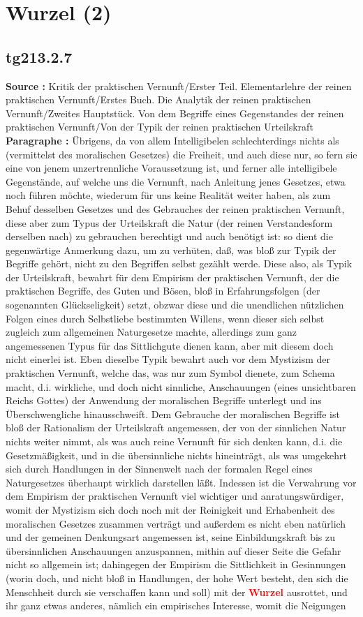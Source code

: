 \documentclass[a4paper,12pt,twoside]{book}
\newcommand{\match}[1]{\textcolor{red}{\textbf{#1}}}
\newcommand{\unnumberedsection}[1]{
	\section*{#1}
	\addcontentsline{toc}{section}{#1}
	\markright{#1}
}
\begin{document}
	\unnumberedsection{Wurzel (2)} 
	\subsection*{tg213.2.7} 
	\textbf{Source : }Kritik der praktischen Vernunft/Erster Teil. Elementarlehre der reinen praktischen Vernunft/Erstes Buch. Die Analytik der reinen praktischen Vernunft/Zweites Hauptstück. Von dem Begriffe eines Gegenstandes der reinen praktischen Vernunft/Von der Typik der reinen praktischen Urteilskraft\\  
	
	\textbf{Paragraphe : }Übrigens, da von allem Intelligibelen schlechterdings nichts als (vermittelst des moralischen Gesetzes) die Freiheit, und auch diese nur, so fern sie eine von jenem unzertrennliche Voraussetzung ist, und ferner alle intelligibele Gegenstände, auf welche uns die Vernunft, nach Anleitung  jenes Gesetzes, etwa noch führen möchte, wiederum für uns keine Realität weiter haben, als zum Behuf desselben Gesetzes und des Gebrauches der reinen praktischen Vernunft, diese aber zum Typus der Urteilskraft die Natur (der reinen Verstandesform derselben nach) zu gebrauchen berechtigt und auch benötigt ist: so dient die gegenwärtige Anmerkung dazu, um zu verhüten, daß, was bloß zur Typik der Begriffe gehört, nicht zu den Begriffen selbst gezählt werde. Diese also, als Typik der Urteilskraft, bewahrt für dem Empirism der praktischen Vernunft, der die praktischen Begriffe, des Guten und Bösen, bloß in Erfahrungsfolgen (der sogenannten Glückseligkeit) setzt, obzwar diese und die unendlichen nützlichen Folgen eines durch Selbstliebe bestimmten Willens, wenn dieser sich selbst zugleich zum allgemeinen Naturgesetze machte, allerdings zum ganz angemessenen Typus für das Sittlichgute dienen kann, aber mit diesem doch nicht einerlei ist. Eben dieselbe Typik bewahrt auch vor dem Mystizism der praktischen Vernunft, welche das, was nur zum Symbol dienete, zum Schema macht, d.i. wirkliche, und doch nicht sinnliche, Anschauungen (eines unsichtbaren Reichs Gottes) der Anwendung der moralischen Begriffe unterlegt und ins Überschwengliche hinausschweift. Dem Gebrauche der moralischen Begriffe ist bloß der Rationalism der Urteilskraft angemessen, der von der sinnlichen Natur nichts weiter nimmt, als was auch reine Vernunft für sich denken kann, d.i. die Gesetzmäßigkeit, und in die übersinnliche nichts hineinträgt, als was umgekehrt sich durch Handlungen in der Sinnenwelt nach der formalen Regel eines Naturgesetzes überhaupt wirklich darstellen läßt. Indessen ist die Verwahrung vor dem Empirism der praktischen Vernunft viel wichtiger und anratungswürdiger, womit der Mystizism sich doch noch mit der Reinigkeit und Erhabenheit des moralischen Gesetzes zusammen verträgt und außerdem es nicht eben natürlich und der gemeinen Denkungsart angemessen ist, seine Einbildungskraft bis zu übersinnlichen Anschauungen anzuspannen, mithin auf dieser Seite die Gefahr nicht so allgemein  ist; dahingegen der Empirism die Sittlichkeit in Gesinnungen (worin doch, und nicht bloß in Handlungen, der hohe Wert besteht, den sich die Menschheit durch sie verschaffen kann und soll) mit der \match{Wurzel} ausrottet, und ihr ganz etwas anderes, nämlich ein empirisches Interesse, womit die Neigungen 
\end{document}

